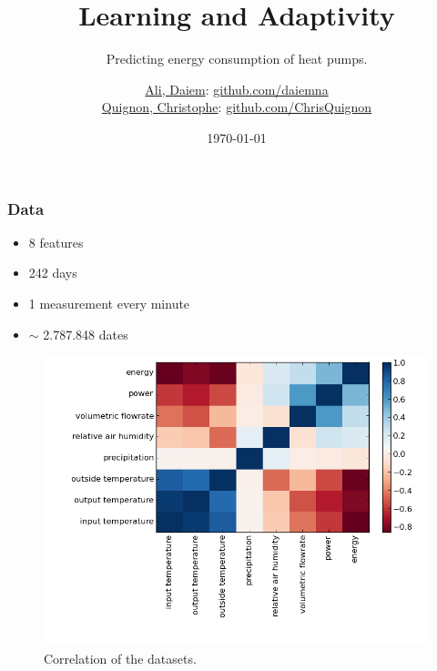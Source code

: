 \documentclass{beamer}
\begin{document}
\title{Learning and Adaptivity}
\subtitle{Predicting energy consumption of heat pumps.}
\author{
  \href{daiem.ali@smail.inf.h-brs.de}{Ali, Daiem}: \href{https://github.com/daiemna}{github.com/daiemna}\\
  \href{christophe.quignon@smail.inf.h-brs.de}{Quignon, Christophe}: \href{https://github.com/ChrisQuignon}{github.com/ChrisQuignon}
} 
\date{\today}

\begin{frame}
\titlepage{}
\end{frame}
	

\begin{frame}
\frametitle{Data}


\begin{itemize}
\item 8 features
\item 242 days
\item 1 measurement every minute
\item $\sim$ 2.787.848 dates
\end{itemize}

\begin{figure}[H]
  \center
  \includegraphics[width=0.6\linewidth]{img/correlation.png}
  \caption{Correlation of the datasets.}
  \label{fig:correlation}
\end{figure}


\end{frame}
\end{document}
